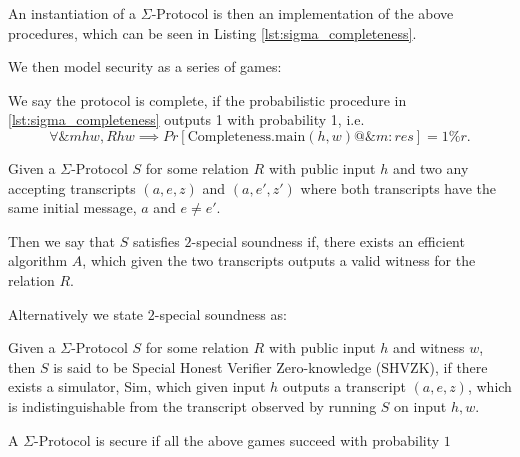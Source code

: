 An instantiation of a $\Sigma$-Protocol is then an implementation of the above
procedures, which can be seen in Listing \ref{lst:sigma_completeness}.

We then model security as a series of games:

\begin{definition}[Completeness]
  We say the protocol is complete, if the probabilistic procedure in
  \ref{lst:sigma_completeness} outputs 1 with probability 1, i.e.
  \begin{equation}
    \label{eq:sigma_completeness}
    \forall \&m h w, R h w \implies Pr[\text{Completeness.main}(h,w) @ \&m : res] = 1\%r.
  \end{equation}
\end{definition}


\begin{definition}
Given a $\Sigma$-Protocol $S$ for some relation $R$ with public input $h$
and two any accepting transcripts $(a,e,z)$ and $(a,e',z')$
where both transcripts have the same initial message, $a$ and $e \neq e'$.

Then we say that $S$ satisfies $2$-special soundness if, there exists an
efficient  algorithm $A$,
which given the two transcripts outputs a valid witness for the relation $R$.

Alternatively we state $2$-special soundness as:
\end{definition}

\begin{definition}
Given a $\Sigma$-Protocol $S$ for some relation $R$ with public input $h$ and
witness $w$, then $S$ is said to be Special Honest Verifier Zero-knowledge
(SHVZK), if there exists a simulator, Sim, which given input $h$ outputs a
transcript $(a,e,z)$, which is indistinguishable from the transcript observed by
running $S$ on input $h, w$.


\end{definition}

\begin{lemma}
  A $\Sigma$-Protocol is secure if all the above games succeed with probability $1$
\end{lemma}



